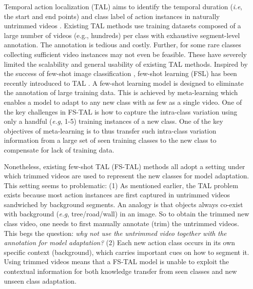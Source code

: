\documentclass{bmvc2k}
\def\eg{\emph{e.g}\bmvaOneDot}
\def\ie{\emph{i.e}\bmvaOneDot}
\begin{document}
Temporal action localization (TAL) aims to identify the temporal duration (\ie, the start and end points) and class label of action instances in naturally untrimmed videos \cite{jiang2014thumos,caba2015activitynet}. 
Existing TAL methods \cite{lin2018bsn,xu2020gtad,buch2017sst,wang2017untrimmednets,zhao2017temporal}  use training datasets composed of a large number of videos (e.g., hundreds) per class  with exhaustive segment-level annotation. The annotation is tedious and costly. Further, for some rare classes collecting sufficient video instances may not even be feasible.  
These have severely limited the scalability  and general usability of existing TAL methods.
Inspired by the success of few-shot image classification \cite{sung2018learning,snell2017prototypical,finn2017model,chen2019closer,rusu2018meta}, few-shot learning (FSL) has been recently introduced to TAL \cite{yang2018one,yang2020localizing,zhang2020metal}.
A few-shot learning model is designed to eliminate the annotation of large training data.
This is achieved by meta-learning which enables a model to adapt to any new class with as few as a single video. One of the key challenges in FS-TAL is how to capture the intra-class variation using only a handful (\eg, 1-5) training instances of a new class. One of the key objectives of meta-learning is to thus transfer such intra-class variation information from a large set of seen training classes to the new class to compensate for lack of training data. 

Nonetheless, existing few-shot TAL (FS-TAL) methods 
\cite{yang2018one,yang2020localizing,zhang2020metal}
all adopt a setting under which trimmed videos are used to represent the new classes for model adaptation. This setting seems to problematic:
(1) As mentioned earlier, the TAL problem exists because  most action instances are first captured in untrimmed videos sandwiched by background segments. An analogy is that objects always co-exist with background (\eg, tree/road/wall) in an image. So to obtain the trimmed new class video, one needs to first manually annotate (trim) the untrimmed videos. This begs the question: \textit{why not use the untrimmed video together with the annotation for model adaptation?}
(2) Each new action class occurs in its own specific context (background), which carries important cues on how to segment it. Using trimmed videos means that a FS-TAL model is unable to exploit the contextual information for both knowledge transfer from seen classes and new unseen class adaptation. 
\end{document}

